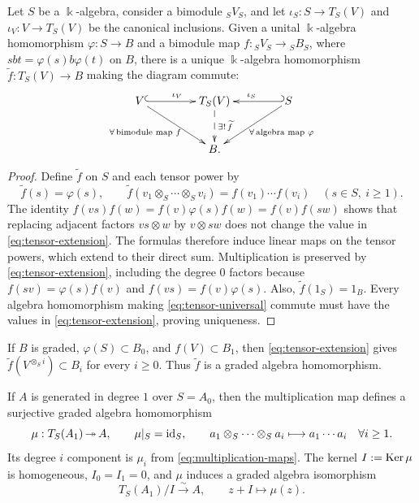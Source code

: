 \begin{proposition}\label{prop:tensor-universal}
Let $S$ be a $\Bbbk$-algebra, consider a bimodule ${}_SV_S$, and let $\iota_S:S\to T_S(V)$ and $\iota_V:V\to T_S(V)$ be the canonical inclusions.
Given a unital $\Bbbk$-algebra homomorphism $\varphi:S\to B$ and a bimodule map $f:{}_SV_S\to{}_SB_S$, where $sbt=\varphi(s)b\varphi(t)$ on $B$, there is a unique $\Bbbk$-algebra homomorphism $\widetilde f:T_S(V)\to B$ making the diagram commute:
\begin{equation}\label{eq:tensor-universal}
\xymatrix@C=42pt@R=28pt{
V \ar@{^{(}->}[r]^{\iota_V} \ar[dr]_{\forall\,\text{bimodule map }f\phantom{...}}
& T_S(V) \ar@{-->}[d]^{\exists!\,\widetilde f}
& S \ar@{_{(}->}[l]_{\iota_S} \ar[dl]^{\phantom{...}\forall\,\text{algebra map }\varphi}\\
& B. &
}
\end{equation}
\end{proposition}
\begin{supplementary}
\begin{proof}
Define $\widetilde f$ on $S$ and each tensor power by
\begin{equation}\label{eq:tensor-extension}
\widetilde f(s)=\varphi(s),\qquad
\widetilde f(v_1\otimes_S\cdots\otimes_S v_i)=f(v_1)\cdots f(v_i)
\quad(s\in S,\ i\geq1).
\end{equation}
The identity $f(vs)f(w)=f(v)\varphi(s)f(w)=f(v)f(sw)$ shows that replacing adjacent factors $vs\otimes w$ by $v\otimes sw$ does not change the value in \eqref{eq:tensor-extension}.
The formulas therefore induce linear maps on the tensor powers, which extend to their direct sum.
Multiplication is preserved by \eqref{eq:tensor-extension}, including the degree $0$ factors because $f(sv)=\varphi(s)f(v)$ and $f(vs)=f(v)\varphi(s)$.
Also, $\widetilde f(1_S)=1_B$.
Every algebra homomorphism making \eqref{eq:tensor-universal} commute must have the values in \eqref{eq:tensor-extension}, proving uniqueness.
\end{proof}

If $B$ is graded, $\varphi(S)\subset B_0$, and $f(V)\subset B_1$, then \eqref{eq:tensor-extension} gives $\widetilde f(V^{\otimes_S i})\subset B_i$ for every $i\geq0$.
Thus $\widetilde f$ is a graded algebra homomorphism.
\end{supplementary}


\begin{corollary}\label{cor:tensor-presentation}
If $A$ is generated in degree $1$ over $S=A_0$, then the multiplication map defines a surjective graded algebra homomorphism
\[
\mu:T_S(A_1)\operatorname{\twoheadrightarrow} A,\qquad \mu|_S=\operatorname{id}_S, \qquad 
a_1\otimes_S\cdots\otimes_S a_i\longmapsto a_1\cdots a_i
\quad \forall i\geq1.
\]
Its degree $i$ component is $\mu_i$ from \eqref{eq:multiplication-maps}.
The kernel $I:=\operatorname{Ker}\nolimits\mu$ is homogeneous, $I_0=I_1=0$, and $\mu$ induces a graded algebra isomorphism
\[
T_S(A_1)/I\xrightarrow{\sim}A,\qquad z+I\longmapsto\mu(z).
\]
\end{corollary}


